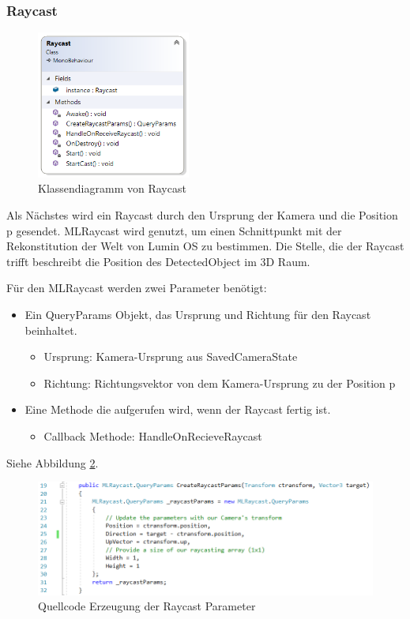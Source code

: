 \subsubsection{Raycast}

\begin{figure}[H]
	\centering
	\includegraphics[width=0.45\textwidth]{images/dia_raycast.PNG}
	\caption[Klassendiagramm von Raycast]{Klassendiagramm von Raycast}
	\label{dia:raycast}
\end{figure}

Als Nächstes wird ein Raycast durch den Ursprung der Kamera und die Position p gesendet. MLRaycast wird genutzt, um einen Schnittpunkt mit der Rekonstitution der Welt von Lumin OS zu bestimmen. Die Stelle, die der Raycast trifft beschreibt die Position des DetectedObject im 3D Raum.

Für den MLRaycast werden zwei Parameter benötigt:
\begin{itemize}
	\item Ein QueryParams Objekt, das Ursprung und Richtung für den Raycast beinhaltet.
	\begin{itemize}
		\item Ursprung: Kamera-Ursprung aus SavedCameraState
		\item Richtung: Richtungsvektor von dem Kamera-Ursprung zu der Position p
	\end{itemize}
	\item Eine Methode die aufgerufen wird, wenn der Raycast fertig ist. 
	\begin{itemize}
		\item Callback Methode: HandleOnRecieveRaycast
	\end{itemize}
\end{itemize}

Siehe Abbildung \ref{code:raycastparams}.

\begin{figure}[H]
	\centering
	\includegraphics[width=1\textwidth]{images/code_raycastparams.PNG}
	\caption[Quellcode Erzeugung der Raycast Parameter]{Quellcode Erzeugung der Raycast Parameter}
	\label{code:raycastparams}
\end{figure}

